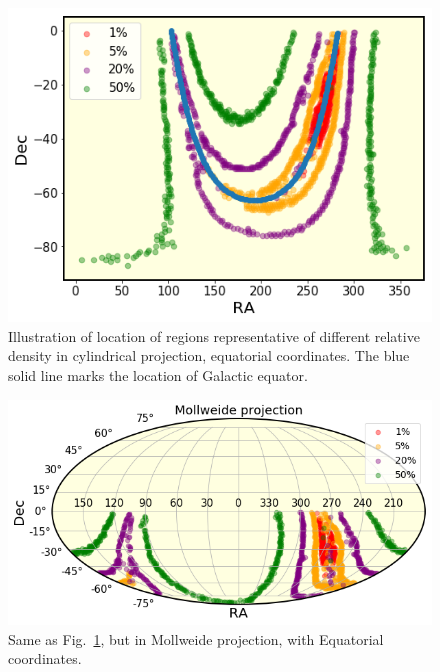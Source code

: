 \documentclass[DM,lsstdraft,toc,usenatbib]{lsstdoc}
\begin{document}
\begin{figure}
\includegraphics[width=1.0\columnwidth]{figs/Illustrate_density_regions.png}
\caption{Illustration of location of regions representative of different relative density in cylindrical projection, equatorial coordinates. The blue solid line marks the location of Galactic equator. }
\label{fig:cart_equat}
\end{figure} 



\begin{figure}
\includegraphics[width=1.0\columnwidth]{figs/Illustrate_density_regions_mollw.png}
\caption{Same as Fig.~\ref{fig:cart_equat}, but in Mollweide projection, with Equatorial coordinates.}
\label{fig:mollw_equat}
\end{figure} 
\end{document}
